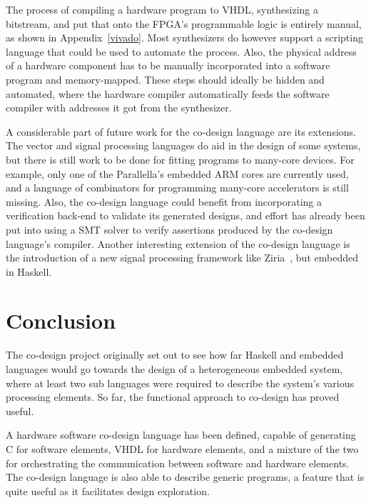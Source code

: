 \documentclass[../paper.tex]{subfiles}
\begin{document}
The process of compiling a hardware program to VHDL, synthesizing a bitstream, and put that onto the FPGA's programmable logic is entirely manual, as shown in Appendix~\ref{vivado}. Most synthesizers do however support a scripting language that could be used to automate the process. Also, the physical address of a hardware component has to be manually incorporated into a software program and memory-mapped. These steps should ideally be hidden and automated, where the hardware compiler automatically feeds the software compiler with addresses it got from the synthesizer.

A considerable part of future work for the co-design language are its extensions. The vector and signal processing languages do aid in the design of some systems, but there is still work to be done for fitting programs to many-core devices. For example, only one of the Parallella's embedded ARM cores are currently used, and a language of combinators for programming many-core accelerators is still missing. Also, the co-design language could benefit from incorporating a verification back-end to validate its generated designs, and effort has already been put into using a SMT solver to verify assertions produced by the co-design language's compiler. Another interesting extension of the co-design language is the introduction of a new signal processing framework like Ziria~\cite{ziria2015}, but embedded in Haskell.

\section{Conclusion}
\label{conc}


The co-design project originally set out to see how far Haskell and embedded languages would go towards the design of a heterogeneous embedded system, where at least two sub languages were required to describe the system's various processing elements. So far, the functional approach to co-design has proved useful.

A hardware software co-design language has been defined, capable of generating C for software elements, VHDL for hardware elements, and a mixture of the two for orchestrating the communication between software and hardware elements. The co-design language is also able to describe generic programs, a feature that is quite useful as it facilitates design exploration.
\end{document}
